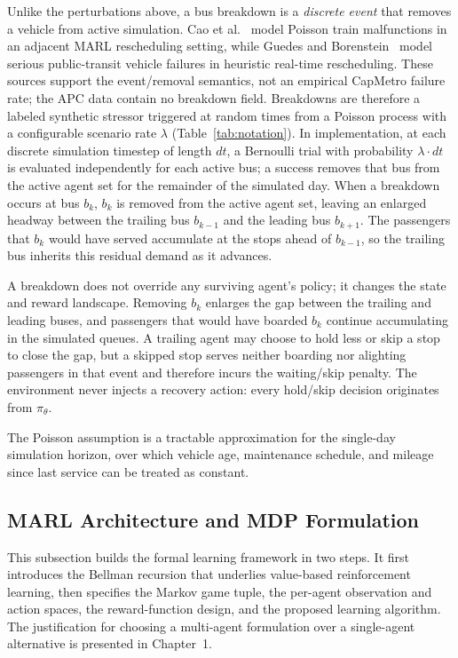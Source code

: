Unlike the perturbations above, a bus breakdown is a \textit{discrete event} that removes a vehicle from active simulation. Cao et al.~\cite{Cao2022Train} model Poisson train malfunctions in an adjacent MARL rescheduling setting, while Guedes and Borenstein~\cite{Guedes2018Rescheduling} model serious public-transit vehicle failures in heuristic real-time rescheduling. These sources support the event/removal semantics, not an empirical CapMetro failure rate; the APC data contain no breakdown field. Breakdowns are therefore a labeled synthetic stressor triggered at random times from a Poisson process with a configurable scenario rate $\lambda$ (Table~\ref{tab:notation}). In implementation, at each discrete simulation timestep of length $dt$, a Bernoulli trial with probability $\lambda \cdot dt$ is evaluated independently for each active bus; a success removes that bus from the active agent set for the remainder of the simulated day. When a breakdown occurs at bus $b_k$, $b_k$ is removed from the active agent set, leaving an enlarged headway between the trailing bus $b_{k-1}$ and the leading bus $b_{k+1}$. The passengers that $b_k$ would have served accumulate at the stops ahead of $b_{k-1}$, so the trailing bus inherits this residual demand as it advances.

A breakdown does not override any surviving agent's policy; it changes the state and reward landscape. Removing $b_k$ enlarges the gap between the trailing and leading buses, and passengers that would have boarded $b_k$ continue accumulating in the simulated queues. A trailing agent may choose to hold less or skip a stop to close the gap, but a skipped stop serves neither boarding nor alighting passengers in that event and therefore incurs the waiting/skip penalty. The environment never injects a recovery action: every hold/skip decision originates from $\pi_\theta$.

The Poisson assumption is a tractable approximation for the single-day simulation horizon, over which vehicle age, maintenance schedule, and mileage since last service can be treated as constant.


\subsection{MARL Architecture and MDP Formulation}

This subsection builds the formal learning framework in two steps. It first introduces the Bellman recursion that underlies value-based reinforcement learning, then specifies the Markov game tuple, the per-agent observation and action spaces, the reward-function design, and the proposed learning algorithm. The justification for choosing a multi-agent formulation over a single-agent alternative is presented in Chapter~1.

